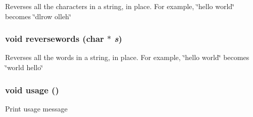 Reverses all the characters in a string, in place. For example, \char`\"{}hello world\char`\"{} becomes \char`\"{}dlrow olleh\char`\"{} 
\subsubsection{\setlength{\rightskip}{0pt plus 5cm}void reversewords (char $\ast$ {\em s})}\label{reverse_8c_6e2fcdfc3580273d08a189d32f435ce9}


Reverses all the words in a string, in place. For example, \char`\"{}hello world\char`\"{} becomes \char`\"{}world hello\char`\"{} 
\subsubsection{\setlength{\rightskip}{0pt plus 5cm}void usage ()}\label{reverse_8c_2ef30c42cbc289d899a8be5d2d8f77d0}


Print usage message 